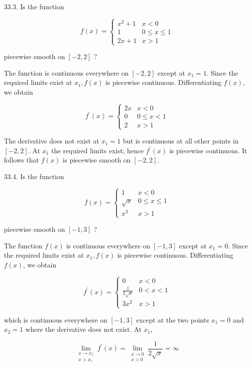 \documentclass[10pt]{article}
\begin{document}
33.3. Is the function

$$
f(x)=\left\{\begin{array}{cr}
x^{2}+1 & x<0 \\
1 & 0 \leq x \leq 1 \\
2 x+1 & x>1
\end{array}\right.
$$

piecewise smooth on $[-2,2]$ ?

The function is continuous everywhere on $[-2,2]$ except at $x_{1}=1$. Since the required limits exist at $x_{1}, f(x)$ is piecewise continuous. Differentiating $f(x)$, we obtain

$$
f^{\prime}(x)=\left\{\begin{array}{cr}
2 x & x<0 \\
0 & 0 \leq x<1 \\
2 & x>1
\end{array}\right.
$$

The derivative does not exist at $x_{1}=1$ but is continuous at all other points in $[-2,2]$. At $x_{1}$ the required limits exist; hence $f^{\prime}(x)$ is piecewise continuous. It follows that $f(x)$ is piecewise smooth on $[-2,2]$.

33.4. Is the function

$$
f(x)=\left\{\begin{array}{cr}
1 & x<0 \\
\sqrt{x} & 0 \leq x \leq 1 \\
x^{3} & x>1
\end{array}\right.
$$

piecewise smooth on $[-1,3]$ ?

The function $f(x)$ is continuous everywhere on $[-1,3]$ except at $x_{1}=0$. Since the required limits exist at $x_{1}, f(x)$ is piecewise continuous. Differentiating $f(x)$, we obtain

$$
f^{\prime}(x)=\left\{\begin{array}{cr}
0 & x<0 \\
\frac{1}{2 \sqrt{x}} & 0<x<1 \\
3 x^{2} & x>1
\end{array}\right.
$$

which is continuous everywhere on $[-1,3]$ except at the two points $x_{1}=0$ and $x_{2}=1$ where the derivative does not exist. At $x_{1}$,

$$
\lim _{\substack{x \rightarrow x_{1} \\ x>x_{1}}} f^{\prime}(x)=\lim _{\substack{x \rightarrow 0 \\ x>0}} \frac{1}{2 \sqrt{x}}=\infty
$$
\end{document}
